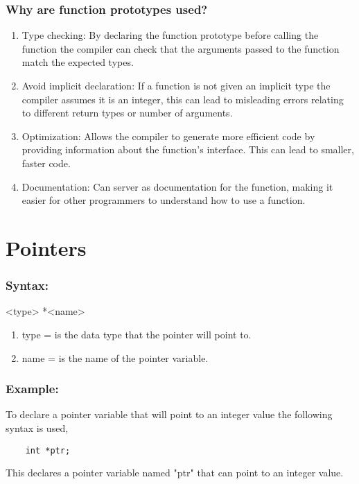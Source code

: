 \documentclass[12pt, letterpaper]{report}
\begin{document}
\subsection{Why are function prototypes used?}

\begin{enumerate}
	\item Type checking: By declaring the function prototype before calling the 
		function the compiler can check that the arguments passed to the function 
		match the expected types.
	\item Avoid implicit declaration: If a function is not given an implicit type 
		the compiler assumes it is an integer, this can lead to misleading errors 
		relating to different return types or number of arguments.
	\item Optimization: Allows the compiler to generate more efficient code by
		providing information about the function's interface. This can lead to
		smaller, faster code.
	\item Documentation: Can server as documentation for the function, making
		it easier for other programmers to understand how to use a function.
\end{enumerate}

\chapter{Pointers}

	\subsection*{Syntax:}
	<type> *<name>

\vspace{0.25cm}

\begin{enumerate}
	\item type = is the data type that the pointer will point to.
	\item name = is the name of the pointer variable.
\end{enumerate}


\subsection*{Example:}
To declare a pointer variable that will point to an integer value the 
following syntax is used,
\begin{lstlisting}
	int *ptr;
\end{lstlisting}
This declares a pointer variable named "ptr" that can point to an integer 
value.\\
\end{document}
